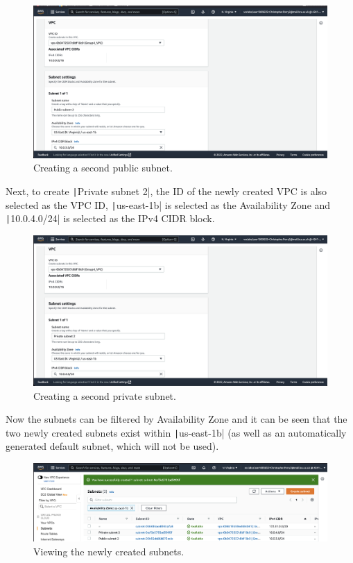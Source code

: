 \begin{figure}[!htbp]
    \centering
    \includegraphics[width=\textwidth]{resources/vpc/routes/vpc-public-subnet-2}
    \caption{Creating a second public subnet.}
    \label{fig:vpc-public-subnet-2}
\end{figure}

Next, to create \texttt|Private subnet 2|, the ID of the newly created VPC is also selected as the VPC ID,
\texttt|us-east-1b| is selected as the Availability Zone and \texttt|10.0.4.0/24| is selected as the
IPv4 CIDR block.

\begin{figure}[!htbp]
    \centering
    \includegraphics[width=\textwidth]{resources/vpc/routes/vpc-private-subnet-2}
    \caption{Creating a second private subnet.}
    \label{fig:vpc-private-subnet-2}
\end{figure}

Now the subnets can be filtered by Availability Zone and it can be seen that the two newly created subnets exist within
\texttt|us-east-1b| (as well as an automatically generated default subnet, which will not be used).

\begin{figure}[!htbp]
    \centering
    \includegraphics[width=\textwidth]{resources/vpc/routes/vpc-subnets-2}
    \caption{Viewing the newly created subnets.}
    \label{fig:vpc-subnets-2}
\end{figure}

